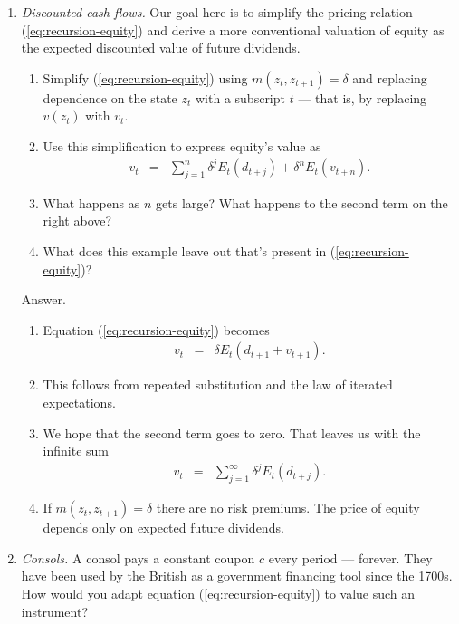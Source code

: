\documentclass[11pt]{article}
\begin{document}
\begin{enumerate}
\item {\it Discounted cash flows.\/}
Our goal here is to simplify the pricing relation (\ref{eq:recursion-equity})
and derive a more conventional valuation of equity
as the expected discounted value of future dividends.
\begin{enumerate}
\item Simplify (\ref{eq:recursion-equity}) using $ m(z_t,z_{t+1}) = \delta $
and replacing dependence on the state $z_t$ with a subscript $t$ ---
that is, by replacing $v(z_t)$ with $v_t$.
\item Use this simplification to express equity's value as
\begin{eqnarray*}
    v_t &=& \sum_{j=1}^n \delta^j E_t (d_{t+j}) + \delta^n E_t (v_{t+n}) .
\end{eqnarray*}
\item What happens as $n$ gets large?
What happens to the second term on the right above?
\item What does this example leave out that's present in (\ref{eq:recursion-equity})?
\end{enumerate}

Answer.
\begin{enumerate}
\item Equation (\ref{eq:recursion-equity}) becomes
\begin{eqnarray*}
    v_t &=& \delta E_t ( d_{t+1} + v_{t+1} ) .
\end{eqnarray*}

\item This follows from repeated substitution
and the law of iterated expectations.

\item We hope that the second term goes to zero.  That leaves us with the infinite sum
\begin{eqnarray*}
    v_t &=& \sum_{j=1}^\infty \delta^j E_t (d_{t+j}) .
\end{eqnarray*}

\item If $ m(z_t,z_{t+1}) = \delta $ there are no risk premiums.
The price of equity depends only on expected future dividends.
\end{enumerate}

\item {\it Consols.\/}
A consol pays a constant coupon $c$ every period --- forever.
They have been used by the British as a government financing tool since the 1700s.
How would you adapt equation (\ref{eq:recursion-equity}) to value such an instrument?


\end{enumerate}
\end{document}
